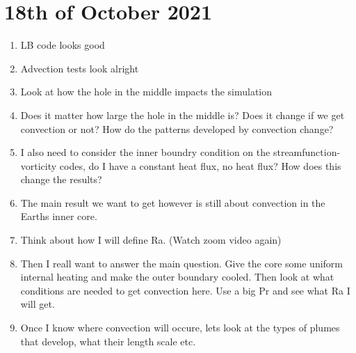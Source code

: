 \documentclass{article}
\begin{document}
\section*{18th of October 2021}
\begin{enumerate}
	\item LB code looks good
	\item Advection tests look alright
	\item Look at how the hole in the middle impacts the simulation
	\item Does it matter how large the hole in the middle is? Does it change if we get convection or not? How do the patterns developed by convection change?
	\item I also need to consider the inner boundry condition on the streamfunction-vorticity codes, do I have a constant heat flux, no heat flux? How does
	this change the results?
	\item The main result we want to get however is still about convection in the Earths inner core. 
	\item Think about how I will define Ra. (Watch zoom video again)
	\item Then I reall want to answer the main question. Give the core some uniform internal heating and make the outer boundary cooled. Then look at what conditions 
	are needed to get convection here. Use a big Pr and see what Ra I will get.
	\item Once I know where convection will occure, lets look at the types of plumes that develop, what their length scale etc.
\end{enumerate}

\newpage
\end{document}
